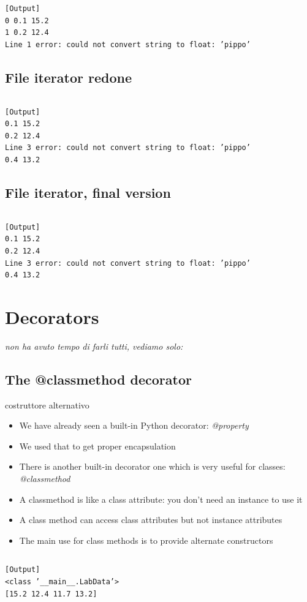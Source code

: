 \inputminted{python}{snippets/file_iterator.py}

\begin{verbatim}
[Output]
0 0.1 15.2
1 0.2 12.4
Line 1 error: could not convert string to float: ’pippo’
\end{verbatim}

\subsection{File iterator redone}


\inputminted{python}{snippets/file_iterator_2.py}

\begin{verbatim}
[Output]
0.1 15.2
0.2 12.4
Line 3 error: could not convert string to float: ’pippo’
0.4 13.2
\end{verbatim}


\subsection{File iterator, final version}

\inputminted{python}{snippets/file_iterator_3.py}

\begin{verbatim}
[Output]
0.1 15.2
0.2 12.4
Line 3 error: could not convert string to float: ’pippo’
0.4 13.2
\end{verbatim}

\section{Decorators}
\textit{non ha avuto tempo di farli tutti, vediamo solo:}
  \subsection{The @classmethod decorator}
costruttore alternativo
  \begin{itemize}
    \item We have already seen a built-in Python decorator: \emph{@property}
    \item We used that to get proper encapsulation
    \item There is another built-in decorator one which is very useful for classes: \alert{\emph{@classmethod}}
    \item A classmethod is like a class attribute: you don't need an instance to
          use it
    \item A class method can access class attributes but not instance attributes
    \item The main use for class methods is to provide \alert{alternate constructors}
  \end{itemize}


\inputminted{python}{snippets/classmethod.py}

\begin{verbatim}
[Output]
<class ’__main__.LabData’>
[15.2 12.4 11.7 13.2]
\end{verbatim}


